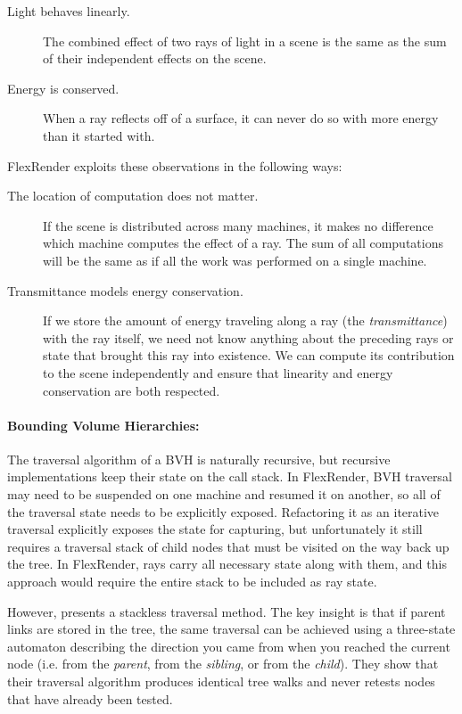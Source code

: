 \documentclass[a4paper,twoside]{article}
\begin{document}
\begin{description}
    \item[Light behaves linearly.] The combined effect of two rays of light
        in a scene is the same as the sum of their independent effects on the
        scene.
    \item[Energy is conserved.] When a ray reflects off of a surface, it can
        never do so with more energy than it started with.
\end{description}

FlexRender exploits these observations in the following ways:

\begin{description}
    \item[The location of computation does not matter.] If the scene is
        distributed across many machines, it makes no difference which machine
        computes the effect of a ray. The sum of all computations will be the
        same as if all the work was performed on a single machine.
    \item[Transmittance models energy conservation.] If we store the amount of
        energy traveling along a ray (the \emph{transmittance}) with the ray
        itself, we need not know anything about the preceding rays or state
        that brought this ray into existence. We can compute its contribution
        to the scene independently and ensure that linearity and energy
        conservation are both respected.
\end{description}

\paragraph{Bounding Volume Hierarchies:}
The traversal algorithm of a BVH is naturally recursive, but recursive
implementations keep their state on the call stack. In FlexRender, BVH traversal may need
to be suspended on one machine and resumed it on another, so
all of the traversal state needs to be explicitly exposed. Refactoring it as an iterative
traversal explicitly exposes the state for capturing, but unfortunately it still
requires a traversal stack of child nodes that must be visited on the way back
up the tree. In FlexRender, rays carry all necessary state along with them,
and this approach would require the entire stack to be included as ray state.

However, \cite{hapala:2011} presents a stackless traversal method. The key
insight is that if parent links are stored in the tree, the same traversal can
be achieved using a three-state automaton describing the direction you came
from when you reached the current node (i.e. from the \emph{parent}, from the
\emph{sibling}, or from the \emph{child}). They show that their traversal
algorithm produces identical tree walks and never retests nodes that have
already been tested.
\end{document}
